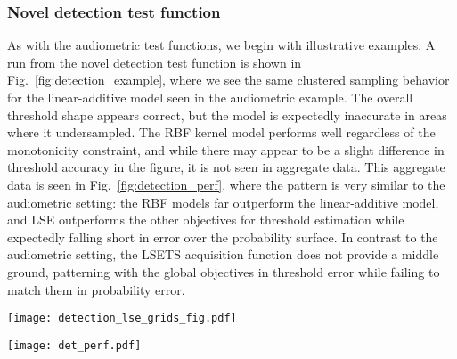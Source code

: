 \documentclass[../main.tex]{subfiles}
\begin{document}
\subsubsection{Novel detection test function}
As with the audiometric test functions, we begin with illustrative examples. A run from the novel detection test function is shown in Fig.~\ref{fig:detection_example}, where we see the same clustered sampling behavior for the linear-additive model seen in the audiometric example. The overall threshold shape appears correct, but the model is expectedly inaccurate in areas where it undersampled. The RBF kernel model performs well regardless of the monotonicity constraint, and while there may appear to be a slight difference in threshold accuracy in the figure, it is not seen in aggregate data. This aggregate data is seen in Fig.~\ref{fig:detection_perf}, where the pattern is very similar to the audiometric setting: the RBF models far outperform the linear-additive model, and LSE outperforms the other objectives for threshold estimation while expectedly falling short in error over the probability surface. In contrast to the audiometric setting, the LSETS acquisition function does not provide a middle ground, patterning with the global objectives in threshold error while failing to match them in probability error.

\begin{figure*}[!htb]
    \centering
    \texttt{[image: detection\_lse\_grids\_fig.pdf]}
    \caption{\textbf{Example of samples taken by three representative models on the novel detection test function after 50 trials}. All models begin with the same 5 trials generated from a Sobol sequence and then proceed according to their acquisition function (BALD in the case of the linear-additive model; LSE otherwise). The linear-additive model oversamples the right side of the space, likely due to over-confidence driven by the additive structure. The final estimate does not overlap the true threshold on the left of the plot. Both RBF models with the LSE objective produce good mean threshold estimates. Note that the nonmonotonic model takes multiple samples at the upper and lower boundaries of the space, whereas the monotonic model does not because the monotonicity constraint makes it highly unlikely that the threshold is located there.}
    \label{fig:detection_example}
\end{figure*}

\begin{figure*}[!htb]
    \centering
    \texttt{[image: det\_perf.pdf]}
    \caption{\textbf{Novel detection test function performance}. LSE is competitive in terms of error in both threshold (\emph{left}) and probability (\emph{right}), followed by BALV/BALD and LSETS. For very small numbers of trials, the linear additive model's strong priors allow it to outperform the more flexible models, but with more data the restrictive assumptions hold it back. The monotonic model generally fails to outperform the nonmonotonic one. Shaded intervals are a 0.95 confidence interval over simulations. }
    \label{fig:detection_perf}
\end{figure*}
\end{document}
